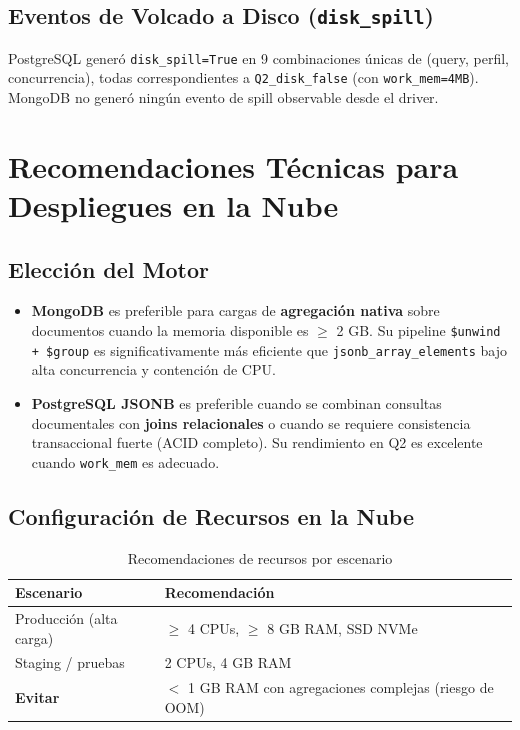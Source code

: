 \documentclass[12pt,a4paper]{article}
\newcommand{\mongo}{\textcolor{mongogreen}{\textbf{MongoDB}}}
\newcommand{\pg}{\textcolor{pgblue}{\textbf{PostgreSQL JSONB}}}
\begin{document}
\subsection{Eventos de Volcado a Disco (\texttt{disk\_spill})}

PostgreSQL generó \texttt{disk\_spill=True} en 9 combinaciones únicas de (query, perfil, concurrencia), todas correspondientes a \texttt{Q2\_disk\_false} (con \texttt{work\_mem=4MB}). MongoDB no generó ningún evento de spill observable desde el driver.

\section{Recomendaciones Técnicas para Despliegues en la Nube}

\subsection{Elección del Motor}

\begin{itemize}
  \item \textbf{\mongo{}} es preferible para cargas de \textbf{agregación nativa} sobre documentos cuando la memoria disponible es $\geq$ 2 GB. Su pipeline \texttt{\$unwind + \$group} es significativamente más eficiente que \texttt{jsonb\_array\_elements} bajo alta concurrencia y contención de CPU.
  \item \textbf{\pg{}} es preferible cuando se combinan consultas documentales con \textbf{joins relacionales} o cuando se requiere consistencia transaccional fuerte (ACID completo). Su rendimiento en Q2 es excelente cuando \texttt{work\_mem} es adecuado.
\end{itemize}

\subsection{Configuración de Recursos en la Nube}

\begin{table}[H]
\centering
\caption{Recomendaciones de recursos por escenario}
\begin{tabular}{ll}
\toprule
\textbf{Escenario}              & \textbf{Recomendación} \\
\midrule
Producción (alta carga)         & $\geq$ 4 CPUs, $\geq$ 8 GB RAM, SSD NVMe \\
Staging / pruebas               & 2 CPUs, 4 GB RAM \\
\textbf{Evitar}                 & $<$ 1 GB RAM con agregaciones complejas (riesgo de OOM) \\
\bottomrule
\end{tabular}
\end{table}
\end{document}
